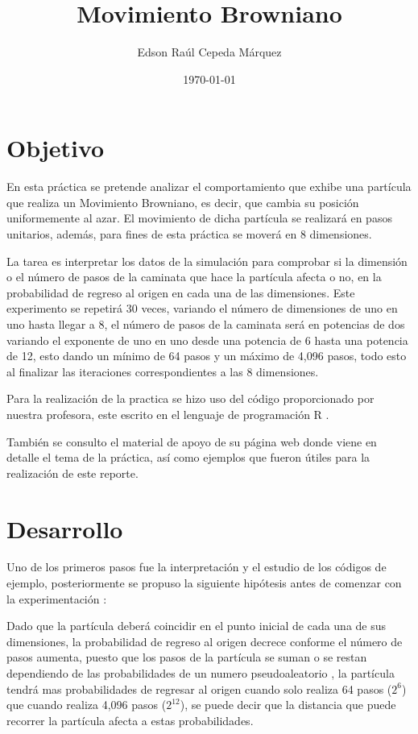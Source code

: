 \documentclass{article}
\author{Edson Raúl Cepeda Márquez}
\title{Movimiento Browniano}
\date{\today}
\begin{document}
\maketitle

\section{Objetivo}

En esta práctica se pretende analizar el comportamiento que exhibe una partícula que realiza un Movimiento Browniano, es decir, que cambia su posición uniformemente al azar. El movimiento de dicha partícula se realizará en pasos unitarios, además,  para fines de esta práctica se moverá en 8 dimensiones.

La tarea es interpretar los datos de la simulación para comprobar si la dimensión o el número de pasos de la caminata que hace la partícula afecta o no, en la probabilidad de regreso al origen en cada una de las dimensiones. Este experimento se repetirá 30 veces, variando el número de dimensiones de uno en uno hasta llegar a 8, el número de pasos de la caminata será en potencias de dos variando el exponente de uno en uno desde una potencia de 6 hasta una potencia de 12, esto dando un mínimo de 64 pasos y un máximo de 4,096 pasos, todo esto al finalizar las iteraciones correspondientes a las 8 dimensiones.

Para la realización de la practica se hizo uso del código proporcionado \cite{satu} por nuestra profesora, este escrito en el lenguaje de programación R \cite{r}.

También se consulto el material de apoyo de su página web \cite{satu} donde viene en detalle el tema de la práctica, así como ejemplos \cite{ast,yes} que fueron útiles para la realización de este reporte. 

\section{Desarrollo}


Uno de los primeros pasos fue la interpretación y el estudio de los códigos de ejemplo, posteriormente se propuso la siguiente hipótesis antes de comenzar con la experimentación : 

Dado que la partícula deberá coincidir en el punto inicial de cada una de sus dimensiones, la probabilidad de regreso al origen decrece conforme el número de pasos aumenta, puesto que los pasos de la partícula se suman o se restan dependiendo de las probabilidades de un numero pseudoaleatorio , la partícula tendrá mas probabilidades de regresar al origen cuando solo realiza 64 pasos ($2^6$) que cuando realiza 4,096 pasos ($2^{12}$), se puede decir que la distancia que puede recorrer la partícula afecta a estas probabilidades.
\end{document}
